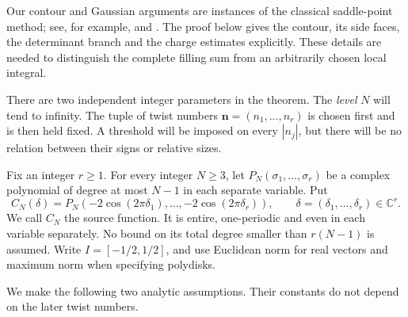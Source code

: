 \documentclass[11pt]{article}
\numberwithin{equation}{section}
\theoremstyle{definition}\newtheorem{definition}[theorem]{Definition}
\theoremstyle{remark}\newtheorem{remark}[theorem]{Remark}
\begin{document}
Our contour and Gaussian arguments are instances of the classical
saddle-point method; see, for example, \cite[\S2.4]{DLMF} and
\cite{Hormander}. The proof below gives the contour, its side faces,
the determinant branch and the charge estimates explicitly. These
details are needed to distinguish the complete filling sum from an
arbitrarily chosen local integral.

There are two independent integer parameters in the theorem. The
\emph{level} $N$ will tend to infinity. The tuple of twist numbers
$\boldsymbol n=(n_1,\ldots,n_r)$ is chosen first and is then held
fixed. A threshold will be imposed on every $|n_j|$, but there will
be no relation between their signs or relative sizes.

Fix an integer $r\ge1$. For every integer $N\ge3$, let
$P_N(\sigma_1,\ldots,\sigma_r)$ be a complex polynomial of degree at
most $N-1$ in each separate variable. Put
\begin{equation}\label{of:source}
 C_N(\delta)=P_N(-2\cos(2\pi\delta_1),\ldots,
                         -2\cos(2\pi\delta_r)),\qquad
 \delta=(\delta_1,\ldots,\delta_r)\in\mathbb C^r.
\end{equation}
We call $C_N$ the source function. It is entire, one-periodic and
even in each variable separately.
No bound on its total degree smaller than $r(N-1)$ is assumed.
Write $I=[-1/2,1/2]$, and use Euclidean norm for real vectors and
maximum norm when specifying polydisks.

We make the following two analytic assumptions. Their constants do not
depend on the later twist numbers.
\end{document}
